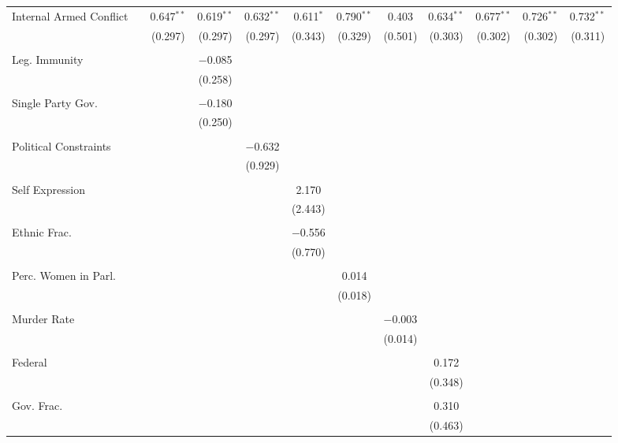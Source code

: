 \documentclass[a4paper]{article}\usepackage[]{graphicx}\usepackage[]{color}
\begin{document}
\begin{table}[H]
\begin{center}
{{\begin{tabular}{@{\extracolsep{5pt}}lccccccccccc}
 Internal Armed Conflict &  & 0.647$^{**}$ & 0.619$^{**}$ & 0.632$^{**}$ & 0.611$^{*}$ & 0.790$^{**}$ & 0.403 & 0.634$^{**}$ & 0.677$^{**}$ & 0.726$^{**}$ & 0.732$^{**}$ \\ 
  &  & (0.297) & (0.297) & (0.297) & (0.343) & (0.329) & (0.501) & (0.303) & (0.302) & (0.302) & (0.311) \\ 
  & & & & & & & & & & & \\ 
 Leg. Immunity &  &  & $-$0.085 &  &  &  &  &  &  &  &  \\ 
  &  &  & (0.258) &  &  &  &  &  &  &  &  \\ 
  & & & & & & & & & & & \\ 
 Single Party Gov. &  &  & $-$0.180 &  &  &  &  &  &  &  &  \\ 
  &  &  & (0.250) &  &  &  &  &  &  &  &  \\ 
  & & & & & & & & & & & \\ 
 Political Constraints &  &  &  & $-$0.632 &  &  &  &  &  &  &  \\ 
  &  &  &  & (0.929) &  &  &  &  &  &  &  \\ 
  & & & & & & & & & & & \\ 
 Self Expression &  &  &  &  & 2.170 &  &  &  &  &  &  \\ 
  &  &  &  &  & (2.443) &  &  &  &  &  &  \\ 
  & & & & & & & & & & & \\ 
 Ethnic Frac. &  &  &  &  & $-$0.556 &  &  &  &  &  &  \\ 
  &  &  &  &  & (0.770) &  &  &  &  &  &  \\ 
  & & & & & & & & & & & \\ 
 Perc. Women in Parl. &  &  &  &  &  & 0.014 &  &  &  &  &  \\ 
  &  &  &  &  &  & (0.018) &  &  &  &  &  \\ 
  & & & & & & & & & & & \\ 
 Murder Rate &  &  &  &  &  &  & $-$0.003 &  &  &  &  \\ 
  &  &  &  &  &  &  & (0.014) &  &  &  &  \\ 
  & & & & & & & & & & & \\ 
 Federal &  &  &  &  &  &  &  & 0.172 &  &  &  \\ 
  &  &  &  &  &  &  &  & (0.348) &  &  &  \\ 
  & & & & & & & & & & & \\ 
 Gov. Frac. &  &  &  &  &  &  &  & 0.310 &  &  &  \\ 
  &  &  &  &  &  &  &  & (0.463) &  &  &  \\ 

\end{tabular}}}
\end{center}
\end{table}
\end{document}
